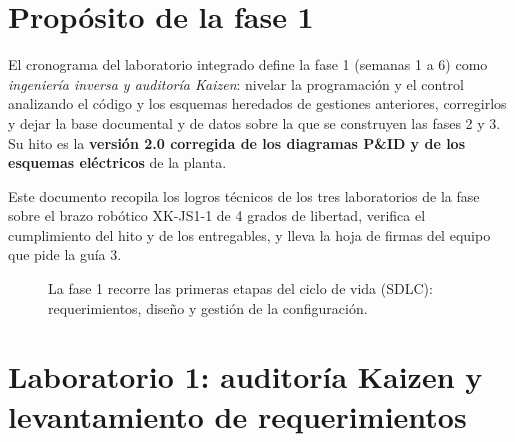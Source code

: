 \documentclass[a4paper,11pt]{article}
\begin{document}

\tableofcontents
\newpage

\section{Propósito de la fase 1}
El cronograma del laboratorio integrado define la fase 1 (semanas 1 a 6) como \emph{ingeniería inversa y auditoría Kaizen}: nivelar la programación y el control analizando el código y los esquemas heredados de gestiones anteriores, corregirlos y dejar la base documental y de datos sobre la que se construyen las fases 2 y 3. Su hito es la \textbf{versión 2.0 corregida de los diagramas P\&ID y de los esquemas eléctricos} de la planta.

Este documento recopila los logros técnicos de los tres laboratorios de la fase sobre el brazo robótico XK-JS1-1 de 4 grados de libertad, verifica el cumplimiento del hito y de los entregables, y lleva la hoja de firmas del equipo que pide la guía 3.

\begin{figure}[H]
\centering
{}
\caption{La fase 1 recorre las primeras etapas del ciclo de vida (SDLC): requerimientos, diseño y gestión de la configuración.}
\end{figure}

\section{Laboratorio 1: auditoría Kaizen y levantamiento de requerimientos}
\end{document}
